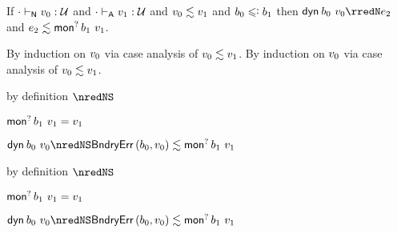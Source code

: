 \begin{lemma}\label{H-dyn-A-bnd}
  If\/ ${\cdot} \vdash_{\mathsf{N}} v_0 : {\mathcal U}$
  and\/ ${\cdot} \vdash_{\mathsf{A}} v_1 : {\mathcal U}$
  and\/ $v_0 \lesssim v_1$
  and\/ $\sbnd_0 \subteq \sbnd_1$
  then\/ $\edynb{\sbnd_0}{\svalue_0} \rredN \sexpr_2$
  and\/ $e_2 \lesssim \mathsf{mon}^{?}\,b_1~v_1$.
\end{lemma}{
  \newcommand{\shortpf}{By induction on $\svalue_0$ via case analysis of $\rexpr{\svalue_0}{\svalue_1}$.}
\begin{lamportproof*}
  \shortpf
\mainproof
  \shortpf

    \begin{pfproof}
        \begin{pfproof}
            \begin{pfproof}
              by definition $\nredNS$
            \end{pfproof}
          \qedstep
            \begin{pfproof}
              $\mathsf{mon}^{?}\,b_1~v_1 = v_1$
            \end{pfproof}
        \end{pfproof}
        \begin{pfproof}
          \qedstep
            \begin{pfproof}
              $\edyn{\sbnd_0}{\svalue_0} \nredNS \rexpr{\boundaryerror{\sbnd_0}{\svalue_0}}{\emopt{\sbnd_1}{\svalue_1}}$
            \end{pfproof}
        \end{pfproof}
    \end{pfproof}

    \begin{pfproof}
        \begin{pfproof}
            \begin{pfproof}
              by definition $\nredNS$
            \end{pfproof}
          \qedstep
            \begin{pfproof}
              $\mathsf{mon}^{?}\,b_1~v_1 = v_1$
            \end{pfproof}
        \end{pfproof}
        \begin{pfproof}
          \qedstep
            \begin{pfproof}
              $\edyn{\sbnd_0}{\svalue_0} \nredNS \rexpr{\boundaryerror{\sbnd_0}{\svalue_0}}{\emopt{\sbnd_1}{\svalue_1}}$
            \end{pfproof}
        \end{pfproof}
    \end{pfproof}


\end{lamportproof*}}
